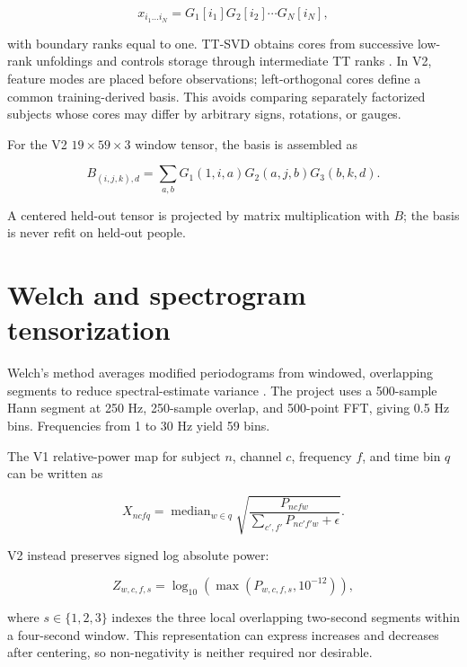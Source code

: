 \begin{equation}
x_{i_1\ldots i_N}=G_1[i_1]G_2[i_2]\cdots G_N[i_N],
\label{eq:tt}
\end{equation}

with boundary ranks equal to one. TT-SVD obtains cores from successive low-rank
unfoldings and controls storage through intermediate TT ranks
\citep{oseledets2011tt}. In V2, feature modes are placed before observations;
left-orthogonal cores define a common training-derived basis. This avoids
comparing separately factorized subjects whose cores may differ by arbitrary
signs, rotations, or gauges.

For the V2 $19\times59\times3$ window tensor, the basis is assembled as

\begin{equation}
B_{(i,j,k),d}=\sum_{a,b}G_1(1,i,a)G_2(a,j,b)G_3(b,k,d).
\end{equation}

A centered held-out tensor is projected by matrix multiplication with $B$; the
basis is never refit on held-out people.

\section{Welch and spectrogram tensorization}

Welch's method averages modified periodograms from windowed, overlapping
segments to reduce spectral-estimate variance \citep{welch1967fft}. The project
uses a 500-sample Hann segment at 250 Hz, 250-sample overlap, and 500-point FFT,
giving 0.5 Hz bins. Frequencies from 1 to 30 Hz yield 59 bins.

The V1 relative-power map for subject $n$, channel $c$, frequency $f$, and time
bin $q$ can be written as

\begin{equation}
X_{ncfq}=\operatorname{median}_{w\in q}
\sqrt{\frac{P_{ncfw}}{\sum_{c',f'}P_{nc'f'w}+\epsilon}}.
\end{equation}

V2 instead preserves signed log absolute power:

\begin{equation}
Z_{w,c,f,s}=\log_{10}\left(\max(P_{w,c,f,s},10^{-12})\right),
\end{equation}

where $s\in\{1,2,3\}$ indexes the three local overlapping two-second segments
within a four-second window. This representation can express increases and
decreases after centering, so non-negativity is neither required nor desirable.

